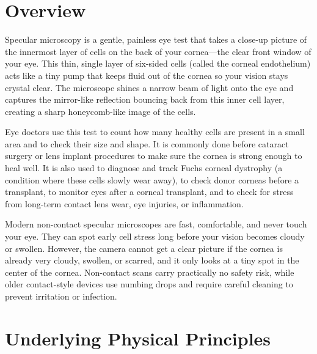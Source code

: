 \label{ch:infographic-specular-microscopy}

\section{Overview}

Specular microscopy is a gentle, painless eye test that takes a close-up picture of the innermost layer of cells on the back of your cornea---the clear front window of your eye. This thin, single layer of six-sided cells (called the corneal endothelium) acts like a tiny pump that keeps fluid out of the cornea so your vision stays crystal clear. The microscope shines a narrow beam of light onto the eye and captures the mirror-like reflection bouncing back from this inner cell layer, creating a sharp honeycomb-like image of the cells.

Eye doctors use this test to count how many healthy cells are present in a small area and to check their size and shape. It is commonly done before cataract surgery or lens implant procedures to make sure the cornea is strong enough to heal well. It is also used to diagnose and track Fuchs corneal dystrophy (a condition where these cells slowly wear away), to check donor corneas before a transplant, to monitor eyes after a corneal transplant, and to check for stress from long-term contact lens wear, eye injuries, or inflammation.

Modern non-contact specular microscopes are fast, comfortable, and never touch your eye. They can spot early cell stress long before your vision becomes cloudy or swollen. However, the camera cannot get a clear picture if the cornea is already very cloudy, swollen, or scarred, and it only looks at a tiny spot in the center of the cornea. Non-contact scans carry practically no safety risk, while older contact-style devices use numbing drops and require careful cleaning to prevent irritation or infection.

\section{Underlying Physical Principles}

